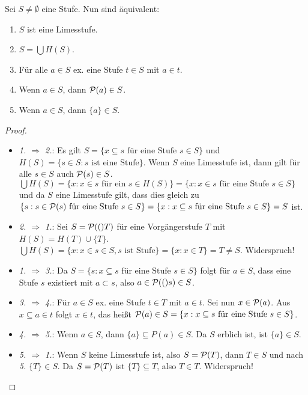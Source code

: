 \begin{satz}
	Sei $S\neq \emptyset$ eine Stufe. Nun sind äquivalent:
	\begin{enumerate}
		\item $S$ ist eine Limesstufe.
		\item $S=\bigcup H(S)$.
		\item Für alle $a\in S$ ex. eine Stufe $t\in S$ mit $a\in t$.
		\item Wenn $a\in S$, dann $\mathcal{P}(a)\in S$.
		\item Wenn $a\in S$, dann $\{a\}\in S$.
	\end{enumerate}
\end{satz}
\begin{proof}
	\begin{itemize}
		\item \textit{1. $\Rightarrow$ 2.}: Es gilt $S=\{x \subseteq s \text{ für eine Stufe } s\in S\}$ und $H(S)=\{s\in S : s\text{ ist eine Stufe}\}$. Wenn $S$ eine Limesstufe ist, dann gilt für alle $s\in S$ auch $\mathcal{P}(s)\in S$. $\bigcup H(S)=\{x : x\in s \text{ für ein } s \in H(S)\}=\{x : x\in s \text{ für eine Stufe } s\in S\}$ und da $S$ eine Limesstufe gilt, dass dies gleich zu $\{s : s \in \mathcal{P}(s) \text{ für eine Stufe } s \in S\}=\{x : x \subseteq s \text{ für eine Stufe } s\in S\}=S$ ist.
		
		\item \textit{2. $\Rightarrow$ 1.}: Sei $S=\mathcal{P}(()T)$ für eine Vorgängerstufe $T$ mit $H(S)=H(T)\cup \{T\}$. $\bigcup H(S)=\{x : x \in s \in S, s \text{ ist Stufe}\} = \{x : x \in T\}=T\neq S$. Widerspruch!
		
		\item \textit{1. $\Rightarrow$ 3.}: Da $S=\{s: x\subseteq s \text{ für eine Stufe } s \in S\}$ folgt für $a\in S$, dass eine Stufe $s$ existiert mit $a\subset s$, also $a\in \mathcal{P}(()s)\in S$.
		
		\item \textit{3. $\Rightarrow$ 4.}: Für $a\in S$ ex. eine Stufe $t\in T$ mit $a\in t$. Sei nun $x\in \mathcal{P}(a)$. Aus $x\subseteq a \in t$ folgt $x\in t$, das heißt $\mathcal{P}(a)\in S=\{x : x\subseteq s \text{ für eine Stufe } s\in S\}$.
		
		\item \textit{4. $\Rightarrow$ 5.}: Wenn $a\in S$, dann $\{a\}\subseteq P(a)\in S$. Da $S$ erblich ist, ist $\{a\}\in S$.
		
		\item \textit{5. $\Rightarrow$ 1.}: Wenn $S$ keine Limesstufe ist, also $S=\mathcal{P}(T)$, dann $T\in S$ und nach \textit{5.} $\{T\}\in S$. Da $S=\mathcal{P}(T)$ ist $\{T\}\subseteq T$, also $T\in T$. Widerspruch!
	\end{itemize}
\end{proof}

